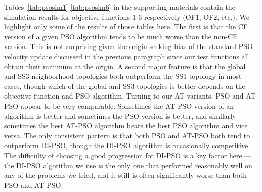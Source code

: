 \documentclass[cmbright]{staauth}
\begin{document}
Tables~\ref{tab:psosim1}-\ref{tab:psosim6} in the supporting materials contain the simulation results for objective functions 1-6 respectively (OF1, OF2, etc.). We highlight only some of the results of those tables here. The first is that the CF version of a given PSO algorithm tends to be much worse than the non-CF version. This is not surprising given the origin-seeking bias of the standard PSO velocity update discussed in the previous paragraph since our test functions all obtain their minimum at the origin. A second major feature is that the global and SS3 neighborhood topologies both outperform the SS1 topology in most cases, though which of the global and SS3 topologies is better depends on the objective function and PSO algorithm. Turning to our AT variants, PSO and AT-PSO appear to be very comparable. Sometimes the AT-PSO version of an algorithm is better and sometimes the PSO version is better, and similarly sometimes the best AT-PSO algorithm beats the best PSO algorithm and vice versa. The only consistent pattern is that both PSO and AT-PSO both tend to outperform DI-PSO, though the DI-PSO algorithm is occasionally competitive. The difficulty of choosing a good progression for DI-PSO is a key factor here --- the DI-PSO algorithm we use is the only one that performed reasonably well on any of the problems we tried, and it still is often significantly worse than both PSO and AT-PSO.
\end{document}
